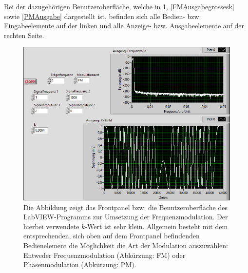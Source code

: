 \documentclass[
a4paper,
12pt,
pagesize,
ngerman
]{scrartcl}
\begin{document}
	\noindent Bei der dazugehörigen Benutzeroberfläche, welche in \cref{FMAusgabekleinesk}, \cref{FMAusgabegrossesk} sowie \cref{PMAusgabe} dargestellt ist, befinden sich alle Bedien- bzw. Eingabeelemente auf der linken und alle Anzeige- bzw. Ausgabeelemente auf der rechten Seite.
	
	\begin{figure}[H]
		\centering
		\includegraphics[width=1.0\textwidth]{EIRE2018Dateien/Tag4/FMPM-Erzeugung/FM-FMPM-Erzeugungp}
		\caption{Die Abbildung zeigt das Frontpanel bzw. die Benutzeroberfläche des LabVIEW-Programms zur Umsetzung der Frequenzmodulation. Der hierbei verwendete $k$-Wert ist sehr klein. Allgemein besteht mit dem entsprechenden, sich oben auf dem Frontpanel befindenden Bedienelement die Möglichkeit die Art der Modulation auszuwählen: Entweder Frequenzmodulation (Abkürzung: FM) oder Phasenmodulation (Abkürzung: PM).}
		\label{FMAusgabekleinesk}
	\end{figure}
	
\end{document}
